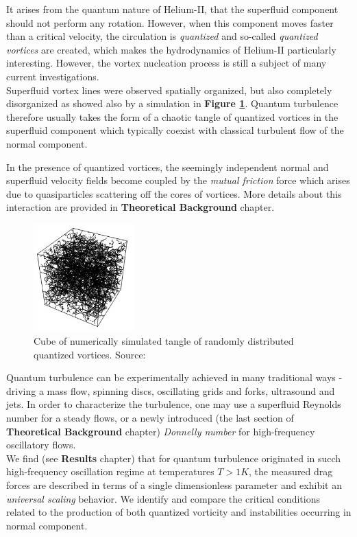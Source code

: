	It arises from the quantum nature of Helium-II, that the superfluid component should not perform any rotation. However, when this component moves faster than a critical velocity, the circulation is \textit{quantized} and so-called \textit{quantized vortices} are created, which makes the hydrodynamics of Helium-II particularly interesting. However, the vortex nucleation process is still a subject of many current investigations.\\
	Superfluid vortex lines were observed spatially organized, but also completely disorganized as showed also by a simulation in \textbf{Figure \ref{sim_cube}}. Quantum turbulence therefore usually takes the form of a chaotic tangle of quantized vortices in the superfluid component which typically coexist with classical turbulent flow of the normal component.

	In the presence of quantized vortices, the seemingly independent normal and superfluid velocity fields become coupled by the \textit{mutual friction} force which arises due to quasiparticles scattering off the cores of vortices. More details about this interaction are provided in \textbf{Theoretical Background} chapter.

	\begin{figure}[h]
		\centering
		\includegraphics[width=0.35\textwidth]{graphics/theory/QT-tangle}
		\caption{Cube of numerically simulated tangle of randomly distributed quantized vortices. Source:\cite{svoc2016}}
		\label{sim_cube}
	\end{figure}

	Quantum turbulence can be experimentally achieved in many traditional ways - driving a mass flow, spinning discs, oscillating grids and forks, ultrasound and jets. In order to characterize the turbulence, one may use a superfluid Reynolds number for a steady flows, or a newly introduced (the last section of \textbf{Theoretical Background} chapter) \textit{Donnelly number} for high-frequency oscillatory flows.\\
	We find (see \textbf{Results} chapter) that for quantum turbulence originated in succh high-frequency oscillation regime at temperatures $T > 1\unit{K}$, the measured drag forces are described in terms of a single dimensionless parameter and exhibit an \textit{universal scaling} behavior. We identify and compare the critical conditions related to the production of both quantized vorticity and instabilities occurring in normal component.

